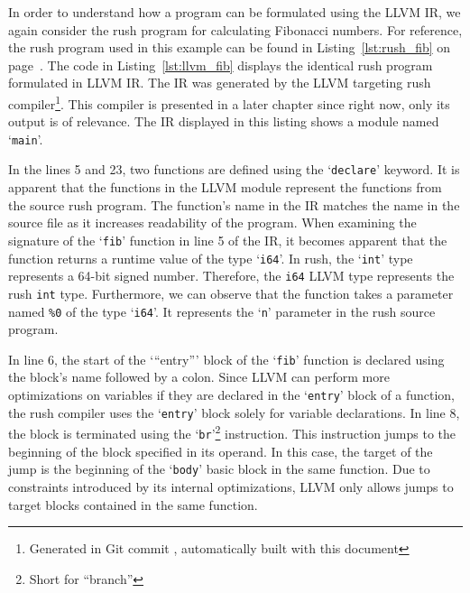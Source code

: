 In order to understand how a program can be formulated using the LLVM IR, we again consider the rush program for calculating Fibonacci numbers.
For reference, the rush program used in this example can be found in Listing~\ref{lst:rush_fib} on page~\pageref{lst:rush_fib}.
The code in Listing~\ref{lst:llvm_fib} displays the identical rush program formulated in LLVM IR.
The IR was generated by the LLVM targeting rush compiler\footnote{Generated in Git commit \rushCommit, automatically built with this document}.
This compiler is presented in a later chapter since right now, only its output is of relevance.
The IR displayed in this listing shows a module named `\texttt{main}'.


In the lines 5 and 23, two functions are defined using the `\texttt{declare}' keyword.
It is apparent that the functions in the LLVM module represent the functions from the source rush program.
The function's name in the IR matches the name in the source file as it increases readability of the program.
When examining the signature of the `\texttt{fib}' function in line 5 of the IR,
it becomes apparent that the function returns a runtime value of the type `\texttt{i64}'.
In rush, the `\texttt{int}' type represents a 64-bit signed number.
Therefore, the \texttt{i64} LLVM type represents the rush \texttt{int} type.
Furthermore, we can observe that the function takes a parameter named \texttt{\%0} of the type `\texttt{i64}'.
It represents the `\texttt{n}' parameter in the rush source program.

In line 6, the start of the `\enquote{entry}' block of the `\texttt{fib}' function is declared using the block's name followed by a colon.
Since LLVM can perform more optimizations on variables if they are declared in the `\texttt{entry}' block of a function,
the rush compiler uses the `\texttt{entry}' block solely for variable declarations.
In line 8, the block is terminated using the `\texttt{br}'\footnote{Short for \enquote{branch}} instruction.
This instruction jumps to the beginning of the block specified in its operand.
In this case, the target of the jump is the beginning of the `\texttt{body}' basic block in the same function.
Due to constraints introduced by its internal optimizations, LLVM only allows jumps to target blocks contained in the same function.

